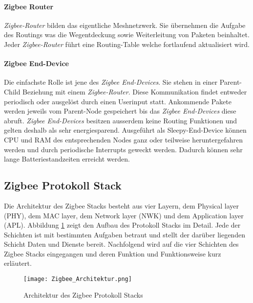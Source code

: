 \paragraph{Zigbee Router}\label{par:ZigbeeRouter}
\textit{Zigbee-Router} bilden das eigentliche Meshnetzwerk. Sie übernehmen die Aufgabe des Routings was die Wegentdeckung sowie Weiterleitung von Paketen beinhaltet. Jeder \textit{Zigbee-Router} führt eine Routing-Table welche fortlaufend aktualisiert wird.

\paragraph{Zigbee End-Device}\label{par:ZigbeeEndDevice}
Die einfachste Rolle ist jene des \textit{Zigbee End-Devices}. Sie stehen in einer Parent-Child Beziehung mit einem \textit{Zigbee-Router}.
Diese Kommunikation findet entweder periodisch oder ausgelöst durch einen Userinput statt.
Ankommende Pakete werden jeweils vom Parent-Node gespeichert bis das  \textit{Zigbee End-Devices} diese abruft.
\textit{Zigbee End-Devices} besitzen ausserdem keine Routing Funktionen und gelten deshalb als sehr energiesparend.
Ausgeführt als Sleepy-End-Device können CPU und RAM des entsprechenden Nodes ganz oder teilweise heruntergefahren werden und durch periodische Interrupts geweckt werden.
Dadurch können sehr lange Batteriestandzeiten erreicht werden. \cite{markus_krause_rainer_konrad_zigbee_2014}


\subsection{Zigbee Protokoll Stack}\label{subsec:ZigbeeProtokollStack}

Die Architektur des Zigbee Stacks besteht aus vier Layern, dem Physical layer (PHY), dem MAC layer, dem Network layer (NWK) und dem Application layer (APL).
Abbildung \ref{fig:ArchitekturdesZigbeeProtokollStacks} zeigt den Aufbau des Protokoll Stacks im Detail.
Jede der Schichten ist mit bestimmten Aufgaben betraut und stellt der darüber liegenden Schicht Daten und Dienste bereit.
Nachfolgend wird auf die vier Schichten des Zigbee Stacks eingegangen und deren Funktion und Funktionsweise kurz erläutert.

\begin{figure}[h]
	\centering
	\texttt{[image: Zigbee\_Architektur.png]}
	\caption{Architektur des Zigbee Protokoll Stacks}
	\label{fig:ArchitekturdesZigbeeProtokollStacks}
\end{figure}

